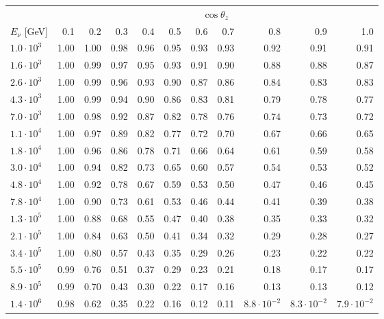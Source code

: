 \documentclass[aps,prd,showpacs,letterpaper,onecolumn,longbibliography,superscriptaddress,notitlepage,nofootinbib]{revtex4-1}%
\begin{document}
\begin{table}[h!]
\centering
\begin{tabular*}{\textwidth}{l @{\extracolsep{\fill}} r r r r r r r r r r}
\toprule
& \multicolumn{10}{c}{$\cos \theta_z$}\\
\cmidrule{2-11}
$E_\nu$ [GeV] & 0.1 & 0.2 & 0.3 & 0.4 & 0.5 & 0.6 & 0.7 & 0.8 & 0.9 & 1.0 \\ 
\midrule
$1.0\cdot10^{3}$ & 1.00 & 1.00 & 0.98 & 0.96 & 0.95 & 0.93 & 0.93 & 0.92 & 0.91 & 0.91 \\ \hline
$1.6\cdot10^{3}$ & 1.00 & 0.99 & 0.97 & 0.95 & 0.93 & 0.91 & 0.90 & 0.88 & 0.88 & 0.87 \\ \hline
$2.6\cdot10^{3}$ & 1.00 & 0.99 & 0.96 & 0.93 & 0.90 & 0.87 & 0.86 & 0.84 & 0.83 & 0.83 \\ \hline
$4.3\cdot10^{3}$ & 1.00 & 0.99 & 0.94 & 0.90 & 0.86 & 0.83 & 0.81 & 0.79 & 0.78 & 0.77 \\ \hline
$7.0\cdot10^{3}$ & 1.00 & 0.98 & 0.92 & 0.87 & 0.82 & 0.78 & 0.76 & 0.74 & 0.73 & 0.72 \\ \hline
$1.1\cdot10^{4}$ & 1.00 & 0.97 & 0.89 & 0.82 & 0.77 & 0.72 & 0.70 & 0.67 & 0.66 & 0.65 \\ \hline
$1.8\cdot10^{4}$ & 1.00 & 0.96 & 0.86 & 0.78 & 0.71 & 0.66 & 0.64 & 0.61 & 0.59 & 0.58 \\ \hline
$3.0\cdot10^{4}$ & 1.00 & 0.94 & 0.82 & 0.73 & 0.65 & 0.60 & 0.57 & 0.54 & 0.53 & 0.52 \\ \hline
$4.8\cdot10^{4}$ & 1.00 & 0.92 & 0.78 & 0.67 & 0.59 & 0.53 & 0.50 & 0.47 & 0.46 & 0.45 \\ \hline
$7.8\cdot10^{4}$ & 1.00 & 0.90 & 0.73 & 0.61 & 0.53 & 0.46 & 0.44 & 0.41 & 0.39 & 0.38 \\ \hline
$1.3\cdot10^{5}$ & 1.00 & 0.88 & 0.68 & 0.55 & 0.47 & 0.40 & 0.38 & 0.35 & 0.33 & 0.32 \\ \hline
$2.1\cdot10^{5}$ & 1.00 & 0.84 & 0.63 & 0.50 & 0.41 & 0.34 & 0.32 & 0.29 & 0.28 & 0.27 \\ \hline
$3.4\cdot10^{5}$ & 1.00 & 0.80 & 0.57 & 0.43 & 0.35 & 0.29 & 0.26 & 0.23 & 0.22 & 0.22 \\ \hline
$5.5\cdot10^{5}$ & 0.99 & 0.76 & 0.51 & 0.37 & 0.29 & 0.23 & 0.21 & 0.18 & 0.17 & 0.17 \\ \hline
$8.9\cdot10^{5}$ & 0.99 & 0.70 & 0.43 & 0.30 & 0.22 & 0.17 & 0.16 & 0.13 & 0.13 & 0.12 \\ \hline
$1.4\cdot10^{6}$ & 0.98 & 0.62 & 0.35 & 0.22 & 0.16 & 0.12 & 0.11 & $8.8\cdot10^{-2}$ & $8.3\cdot10^{-2}$ & $7.9\cdot10^{-2}$ \\ \hline

\end{tabular*}
\end{table}
\end{document}
